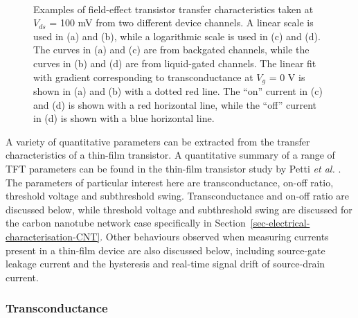\documentclass[
  a4paper,
]{scrbook}
\begin{document}
\begin{figure}
\begin{minipage}[t]{0.45\linewidth}
{{}

}

\end{minipage}%
%
\begin{minipage}[t]{0.01\linewidth}

{\centering 

~

}

\end{minipage}%

\caption{\label{fig-gating-transfer}Examples of field-effect transistor
transfer characteristics taken at \(V_{ds}\) = 100 mV from two different
device channels. A linear scale is used in (a) and (b), while a
logarithmic scale is used in (c) and (d). The curves in (a) and (c) are
from backgated channels, while the curves in (b) and (d) are from
liquid-gated channels. The linear fit with gradient corresponding to
transconductance at \(V_g\) = 0 V is shown in (a) and (b) with a dotted
red line. The ``on'' current in (c) and (d) is shown with a red
horizontal line, while the ``off'' current in (d) is shown with a blue
horizontal line.}

\end{figure}

A variety of quantitative parameters can be extracted from the transfer
characteristics of a thin-film transistor. A quantitative summary of a
range of TFT parameters can be found in the thin-film transistor study
by Petti \emph{et al.} \autocite{Petti2016}. The parameters of
particular interest here are transconductance, on-off ratio, threshold
voltage and subthreshold swing. Transconductance and on-off ratio are
discussed below, while threshold voltage and subthreshold swing are
discussed for the carbon nanotube network case specifically in
Section~\ref{sec-electrical-characterisation-CNT}. Other behaviours
observed when measuring currents present in a thin-film device are also
discussed below, including source-gate leakage current and the
hysteresis and real-time signal drift of source-drain current.

\hypertarget{transconductance}{%
\subsubsection*{Transconductance}\label{transconductance}}
\end{document}
